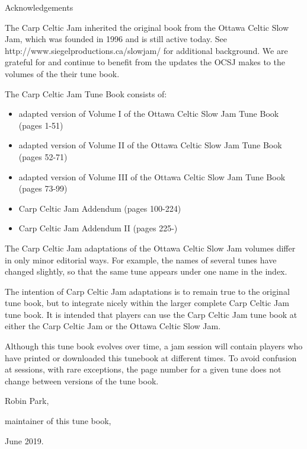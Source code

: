 \documentclass[10pt,fleqn]{article}
\begin{document}
\pagestyle{empty}
\setlength{\parindent}{0pt}
\setlength{\parskip}{1em}
\begin{center}
\LARGE
Acknowledgements
\normalsize
\end{center}

The Carp Celtic Jam inherited the original book from the Ottawa Celtic Slow Jam, which was founded in 1996 and is still active today.  See http://www.siegelproductions.ca/slowjam/ for additional background.  We are grateful for and continue to benefit from the updates the OCSJ makes to the volumes of the their tune book.

The Carp Celtic Jam Tune Book consists of:
\begin{itemize}
\item adapted version of Volume I of the Ottawa Celtic Slow Jam Tune Book (pages 1-51)
\item adapted version of Volume II of the Ottawa Celtic Slow Jam Tune Book (pages 52-71)
\item adapted version of Volume III of the Ottawa Celtic Slow Jam Tune Book (pages 73-99)
\item Carp Celtic Jam Addendum (pages 100-224)
\item Carp Celtic Jam Addendum II (pages 225-)
\end{itemize}

The Carp Celtic Jam adaptations of the Ottawa Celtic Slow Jam volumes differ in only minor editorial ways.  For example, the names of several tunes have changed slightly, so that the same tune appears under one name in the index.

The intention of Carp Celtic Jam adaptations is to remain true to the original tune book, but to integrate nicely within the larger complete Carp Celtic Jam tune book.  It is intended that players can use the Carp Celtic Jam tune book at either the Carp Celtic Jam or the Ottawa Celtic Slow Jam.

Although this tune book evolves over time, a jam session will contain players who have printed or downloaded this tunebook at different times.  To avoid confusion at sessions, with rare exceptions, the page number for a given tune does not change between versions of the tune book.

\begin{flushright}
\setlength{\parskip}{0pt}
Robin Park,

maintainer of this tune book,

June 2019.
\end{flushright}
\end{document}
